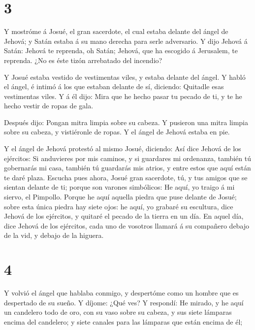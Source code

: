\hypertarget{section-2}{%
\section{3}\label{section-2}}

 Y mostróme á Josué, el gran sacerdote, el cual estaba
delante del ángel de Jehová; y Satán estaba á su mano derecha para serle
adversario.  Y dijo Jehová á Satán: Jehová te reprenda, oh
Satán; Jehová, que ha escogido á Jerusalem, te reprenda. ¿No es éste
tizón arrebatado del incendio?

 Y Josué estaba vestido de vestimentas viles, y estaba
delante del ángel.  Y habló el ángel, é intimó á los que
estaban delante de sí, diciendo: Quitadle esas vestimentas viles. Y á él
dijo: Mira que he hecho pasar tu pecado de ti, y te he hecho vestir de
ropas de gala.

 Después dijo: Pongan mitra limpia sobre su cabeza. Y
pusieron una mitra limpia sobre su cabeza, y vistiéronle de ropas. Y el
ángel de Jehová estaba en pie.

 Y el ángel de Jehová protestó al mismo Josué, diciendo:
 Así dice Jehová de los ejércitos: Si anduvieres por mis
caminos, y si guardares mi ordenanza, también tú gobernarás mi casa,
también tú guardarás mis atrios, y entre estos que aquí están te daré
plaza.  Escucha pues ahora, Josué gran sacerdote, tú, y tus
amigos que se sientan delante de ti; porque son varones simbólicos: He
aquí, yo traigo á mi siervo, el Pimpollo.  Porque he aquí
aquella piedra que puse delante de Josué; sobre esta única piedra hay
siete ojos: he aquí, yo grabaré su escultura, dice Jehová de los
ejércitos, y quitaré el pecado de la tierra en un día.  En
aquel día, dice Jehová de los ejércitos, cada uno de vosotros llamará á
su compañero debajo de la vid, y debajo de la higuera.

\hypertarget{section-3}{%
\section{4}\label{section-3}}

 Y volvió el ángel que hablaba conmigo, y despertóme como un
hombre que es despertado de su sueño.  Y díjome: ¿Qué ves? Y
respondí: He mirado, y he aquí un candelero todo de oro, con su vaso
sobre su cabeza, y sus siete lámparas encima del candelero; y siete
canales para las lámparas que están encima de él;

